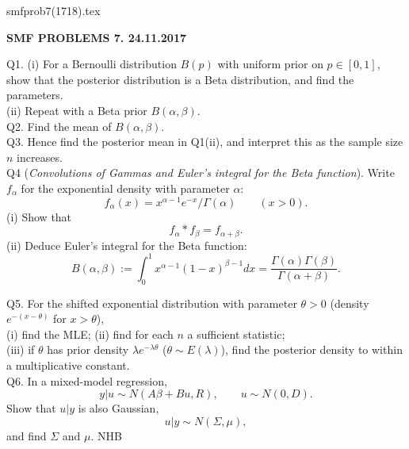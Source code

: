 \documentclass[12pt]{article}
\begin{document}
\def\ni{\noindent}
\def\i{\indent}
\def\a{\alpha}
\def\b{\beta}
\def\e{\epsilon}
\def\d{\delta}
\def\g{\gamma}
\def\qq{\qquad}
\def\q{\quad}
\def\L{\Lambda}
\def\C{\cal C}
\def\E{\cal E}
\def\G{\Gamma}
\def\F{\cal F}
\def\K{\cal K}
\def\O{\cal O}
\def\A{\cal A}
\def\B{\cal B}
\def\S{\cal S}
\def\N{\cal N}
\def\M{\cal M}
\def\P{\cal P}
\def\Om{\Omega}
\def\om{\omega}
\def\s{\sigma}
\def\t{\theta}
\def\z{\zeta}
\def\p{\phi}
\def\m{\mu}
\def\n{\nu}
\def\b{\beta}
\def\e{\epsilon}
\def\l{\lambda}
\def\Si{\Sigma}
\def\half{\frac{1}{2}}
\def\hb{\hfil \break}
\ni smfprob7(1718).tex \\
\begin{center}
{\bf SMF PROBLEMS 7.  24.11.2017} \\
\end{center}

\ni Q1. (i) For a Bernoulli distribution $B(p)$ with uniform prior on $p \in [0,1]$, show that the posterior distribution is a Beta distribution, and find the parameters. \\
(ii)  Repeat with a Beta prior $B(\a, \b)$. \\

\ni Q2.  Find the mean of $B(\a, \b)$. \\

\ni Q3.  Hence find the posterior mean in Q1(ii), and interpret this as the sample size $n$ increases. \\

\ni Q4 ({\it Convolutions of Gammas and Euler's integral for the Beta function}).  Write $f_{\a}$ for the exponential density with parameter ${\a}$:
$$
f_{\a}(x) = x^{\a - 1} e^{-x}/\G(\a) \qquad (x > 0).
$$
(i) Show that
$$f_{\a} \ast f_{\b} = f_{\a + \b}.
$$
(ii)  Deduce Euler's integral for the Beta function:
$$
B(\a, \b) := \int_0^1 x^{\a - 1} (1-x)^{\b - 1} dx = \frac{\G(\a) \G(\b)}{\G(\a + \b)}.
$$

\ni Q5.  For the shifted exponential distribution with parameter $\t > 0$ (density $e^{-(x-\t)}$ for $x > \t$), \\
(i) find the MLE; (ii) find for each $n$ a sufficient statistic; \\
(iii) if $\t$ has prior density $\l e^{-\l \t}$ ($\t \sim E(\l)$), find the posterior density to within a multiplicative constant.\\

\ni Q6.  In a mixed-model regression,
$$
y|u \sim N(A \b + Bu, R), \qquad u \sim N(0,D).
$$
Show that $u|y$ is also Gaussian,
$$
u|y \sim N(\Sigma, \mu),
$$
and find $\Sigma$ and $\mu$.            \hfil NHB \break
\end{document}
